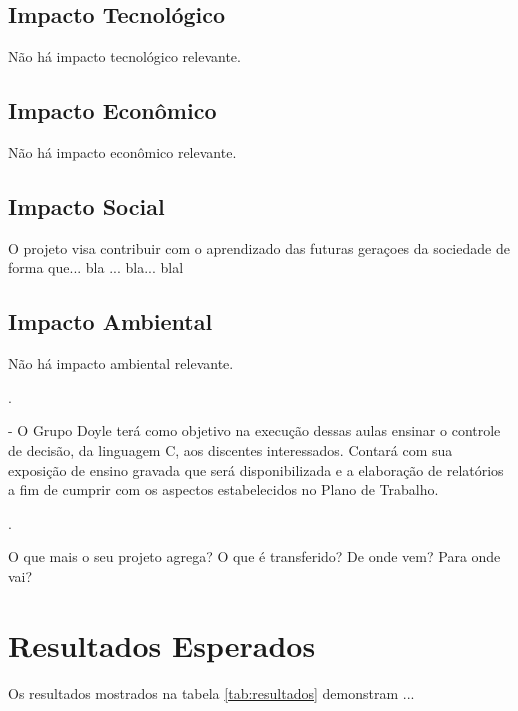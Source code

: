 \documentclass[a4paper,10pt]{article}  %
\begin{document}
 \subsection{Impacto Tecnológico}

Não há impacto tecnológico relevante.

 \subsection{Impacto Econômico}

Não há impacto econômico relevante.

 \subsection{Impacto Social}

O projeto visa contribuir com o aprendizado das futuras geraçoes da sociedade de forma que... bla ... bla... blal

 \subsection{Impacto Ambiental}

Não há impacto ambiental relevante.

.

 - O Grupo Doyle terá como objetivo na execução dessas aulas ensinar o controle de decisão, da linguagem C, aos discentes interessados.
 Contará com sua exposição de ensino gravada que será disponibilizada e a elaboração de relatórios a fim de cumprir com os aspectos estabelecidos no Plano de Trabalho.


.

O que mais o seu projeto agrega? O que é transferido? De onde vem? Para onde vai?


\section{Resultados Esperados}

Os resultados mostrados na tabela \ref{tab:resultados} demonstram ...
\end{document}
